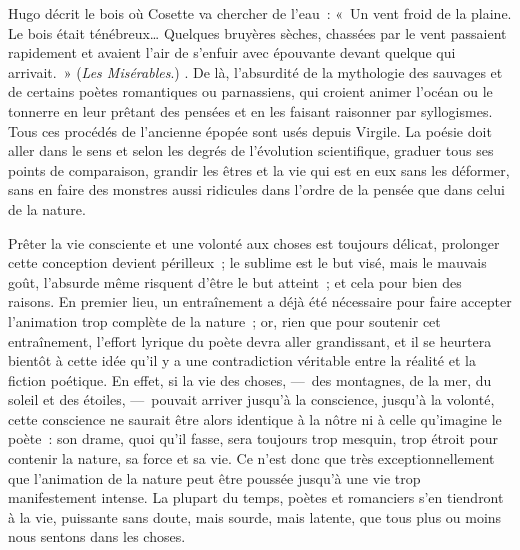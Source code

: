 \documentclass[french,twoside]{book} %
\begin{document}
{Hugo décrit le bois où Cosette va chercher de l’eau : « Un vent froid de la plaine. Le bois était ténébreux… Quelques bruyères sèches, chassées par le vent passaient rapidement et avaient l’air de s’enfuir avec épouvante devant quelque qui arrivait. » (\emph{Les Misérables}.)
}. De là, l’absurdité de la mythologie des sauvages et de certains poètes romantiques ou parnassiens, qui croient animer l’océan ou le tonnerre en leur prêtant des pensées et en les faisant raisonner par syllogismes. Tous ces procédés de l’ancienne épopée sont usés depuis Virgile. La poésie doit aller dans le sens et selon les degrés de l’évolution scientifique, graduer tous ses points de comparaison, grandir les êtres et la vie qui est en eux sans les déformer, sans en faire des monstres aussi ridicules dans l’ordre de la pensée que dans celui de la nature.\par
Prêter la vie consciente et une volonté aux choses est toujours délicat, prolonger cette conception devient périlleux ; le sublime est le but visé, mais le mauvais goût, l’absurde même risquent d’être le but atteint ; et cela pour bien des raisons. En premier lieu, un entraînement a déjà été nécessaire pour faire accepter l’animation trop complète de la nature ; or, rien que pour soutenir cet entraînement, l’effort lyrique du poète devra aller grandissant, et il se heurtera bientôt à cette idée qu’il y a une contradiction véritable entre la réalité et la fiction poétique. En effet, si la vie des choses, — des montagnes, de la mer, du soleil et des étoiles, — pouvait arriver jusqu’à la conscience, jusqu’à la volonté, cette conscience ne saurait être alors identique à la nôtre ni à celle qu’imagine le poète : son drame, quoi qu’il fasse, sera toujours trop mesquin, trop étroit pour contenir la nature, sa force et sa vie. Ce n’est donc que très exceptionnellement que l’animation de la nature peut être poussée jusqu’à une vie trop manifestement intense. La plupart du temps, poètes et romanciers s’en tiendront à la vie, puissante sans doute, mais sourde, mais latente, que tous plus ou moins nous sentons dans les choses.\par
\end{document}
